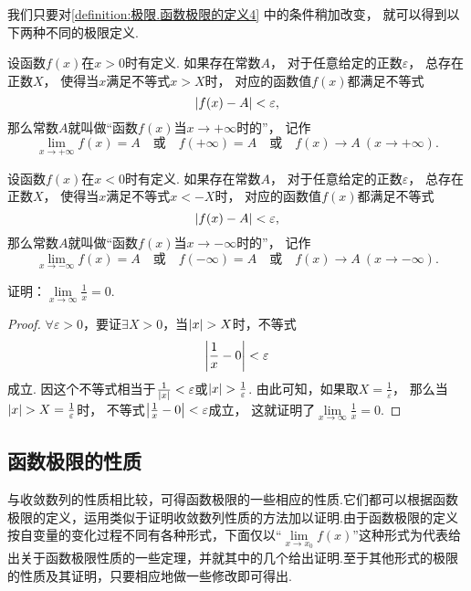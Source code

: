 我们只要对\cref{definition:极限.函数极限的定义4} 中的条件稍加改变，
就可以得到以下两种不同的极限定义.
\begin{definition}\label{definition:极限.函数极限的定义5}
设函数\(f(x)\)在\(x > 0\)时有定义.
如果存在常数\(A\)，
对于任意给定的正数\(\varepsilon\)，
总存在正数\(X\)，
使得当\(x\)满足不等式\(x > X\)时，
对应的函数值\(f(x)\)都满足不等式\[
\abs{f(x) - A} < \varepsilon,
\]那么常数\(A\)就叫做“函数\(f(x)\)当\(x \to +\infty\)时的”，
记作\[
\lim\limits_{x \to +\infty} f(x) = A
\quad\text{或}\quad
f(+\infty) = A
\quad\text{或}\quad
f(x) \to A\ (x \to +\infty).
\]
\end{definition}

\begin{definition}\label{definition:极限.函数极限的定义6}
设函数\(f(x)\)在\(x < 0\)时有定义.
如果存在常数\(A\)，
对于任意给定的正数\(\varepsilon\)，
总存在正数\(X\)，
使得当\(x\)满足不等式\(x < -X\)时，
对应的函数值\(f(x)\)都满足不等式\[
\abs{f(x) - A} < \varepsilon,
\]那么常数\(A\)就叫做“函数\(f(x)\)当\(x \to -\infty\)时的”，
记作\[
\lim\limits_{x \to -\infty} f(x) = A
\quad\text{或}\quad
f(-\infty) = A
\quad\text{或}\quad
f(x) \to A\ (x \to -\infty).
\]
\end{definition}

\begin{example}
\def\l{\lim\limits_{x\to\infty}}
证明：\(\l \frac{1}{x} = 0\).
\begin{proof}
\(\forall\varepsilon>0\)，要证\(\exists X > 0\)，当\(\abs{x}>X\)时，不等式\[
\abs{\frac{1}{x}-0}<\varepsilon
\]成立.
因这个不等式相当于\(\frac{1}{\abs{x}}<\varepsilon\)或\(\abs{x}>\frac{1}{\varepsilon}\).
由此可知，如果取\(X=\frac{1}{\varepsilon}\)，
那么当\(\abs{x}>X=\frac{1}{\varepsilon}\)时，
不等式\(\abs{\frac{1}{x}-0}<\varepsilon\)成立，
这就证明了\(\l \frac{1}{x} = 0\).
\end{proof}
\end{example}

\subsection{函数极限的性质}
与收敛数列的性质相比较，可得函数极限的一些相应的性质.它们都可以根据函数极限的定义，运用类似于证明收敛数列性质的方法加以证明.由于函数极限的定义按自变量的变化过程不同有各种形式，下面仅以“\(\lim\limits_{x \to x_0}f(x)\)”这种形式为代表给出关于函数极限性质的一些定理，并就其中的几个给出证明.至于其他形式的极限的性质及其证明，只要相应地做一些修改即可得出.

